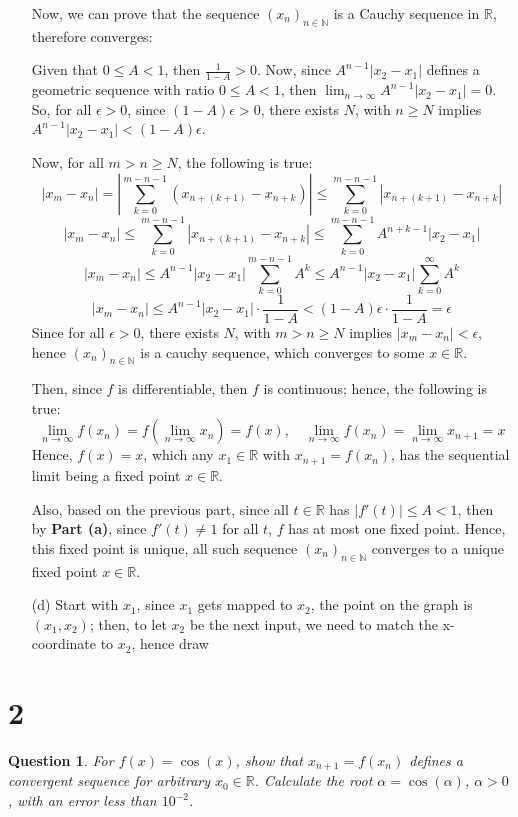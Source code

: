 \documentclass{article}
\newtheorem{question}{Question}
\begin{document}
\begin{itemize}
    \hfil

    Now, we can prove that the sequence $(x_n)_{n\in\mathbb{N}}$ is a Cauchy sequence in $\mathbb{R}$, therefore converges:

    Given that $0\leq A<1$, then $\frac{1}{1-A}>0$. Now, since $A^{n-1}|x_2-x_1|$ defines a geometric sequence with ratio $0\leq A<1$,
    then $\lim_{n\rightarrow\infty}A^{n-1}|x_2-x_1|=0$. So, for all $\epsilon>0$, since $(1-A)\epsilon>0$, there exists $N$,
    with $n\geq N$ implies $A^{n-1}|x_2-x_1|<(1-A)\epsilon$.

    Now, for all $m>n\geq N$, the following is true:
    $$|x_m-x_n| = \left|\sum_{k=0}^{m-n-1}(x_{n+(k+1)}-x_{n+k})\right| \leq \sum_{k=0}^{m-n-1}|x_{n+(k+1)}-x_{n+k}|$$
    $$|x_m-x_n|\leq \sum_{k=0}^{m-n-1}|x_{n+(k+1)}-x_{n+k}| \leq \sum_{k=0}^{m-n-1}A^{n+k-1}|x_2-x_1|$$
    $$|x_m-x_n|\leq A^{n-1}|x_2-x_1|\sum_{k=0}^{m-n-1}A^{k} \leq A^{n-1}|x_2-x_1|\sum_{k=0}^{\infty}A^k$$
    $$|x_m-x_n|\leq A^{n-1}|x_2-x_1|\cdot\frac{1}{1-A} < (1-A)\epsilon \cdot \frac{1}{1-A} = \epsilon$$
    Since for all $\epsilon>0$, there exists $N$, with $m>n\geq N$ implies $|x_m-x_n|<\epsilon$, hence $(x_n)_{n\in\mathbb{N}}$ is a cauchy sequence,
    which converges to some $x\in \mathbb{R}$.

    Then, since $f$ is differentiable, then $f$ is continuous; hence, the following is true:
    $$\lim_{n\rightarrow\infty}f(x_n)=f\left(\lim_{n\rightarrow\infty}x_n\right)=f(x),\quad \lim_{n\rightarrow\infty}f(x_n)=\lim_{n\rightarrow\infty}x_{n+1}=x$$
    Hence, $f(x)=x$, which any $x_1\in\mathbb{R}$ with $x_{n+1}=f(x_n)$, has the sequential limit being a fixed point $x\in\mathbb{R}$.

    Also, based on the previous part, since all $t\in\mathbb{R}$ has $|f'(t)|\leq A<1$, then by \textbf{Part (a)}, since $f'(t)\neq 1$ for all $t$, $f$ has at most one fixed point.
    Hence, this fixed point is unique, all such sequence $(x_n)_{n\in\mathbb{N}}$ converges to a unique fixed point $x\in\mathbb{R}$.

    \hfil

    \item[(d)] Start with $x_1$, since $x_1$ gets mapped to $x_2$, the point on the graph is $(x_1,x_2)$; then, to let $x_2$ be the next input, we need to match the x-coordinate to $x_2$,
    hence draw 
\end{itemize}

\break

\section*{2}
\begin{myBox}[]{}
    \begin{question}
        For $f(x) = \cos(x)$, show that $x_{n+1}=f(x_n)$ defines a convergent sequence
        for arbitrary $x_0\in\mathbb{R}$. Calculate the root $\alpha=\cos(\alpha)$, $\alpha>0$, with an error less than
        $10^{-2}$.
    \end{question}
\end{myBox}
\end{document}
